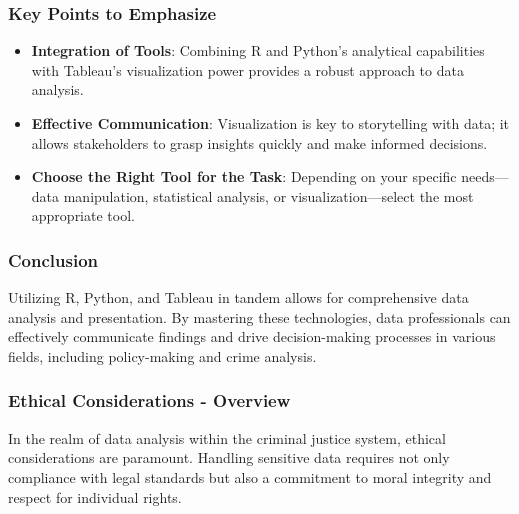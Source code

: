 \documentclass[aspectratio=169]{beamer}
\begin{document}
\begin{frame}[fragile]
    \frametitle{Key Points to Emphasize}
    \begin{itemize}
        \item \textbf{Integration of Tools}: Combining R and Python’s analytical capabilities with Tableau's visualization power provides a robust approach to data analysis.
        
        \item \textbf{Effective Communication}: Visualization is key to storytelling with data; it allows stakeholders to grasp insights quickly and make informed decisions.

        \item \textbf{Choose the Right Tool for the Task}: Depending on your specific needs—data manipulation, statistical analysis, or visualization—select the most appropriate tool.
    \end{itemize}
\end{frame}

\begin{frame}[fragile]
    \frametitle{Conclusion}
    Utilizing R, Python, and Tableau in tandem allows for comprehensive data analysis and presentation. 
    By mastering these technologies, data professionals can effectively communicate findings and drive decision-making processes in various fields, including policy-making and crime analysis.
\end{frame}

\begin{frame}[fragile]
    \frametitle{Ethical Considerations - Overview}
    In the realm of data analysis within the criminal justice system, ethical considerations are paramount. 
    Handling sensitive data requires not only compliance with legal standards but also a commitment to moral integrity and respect for individual rights.
\end{frame}
\end{document}
